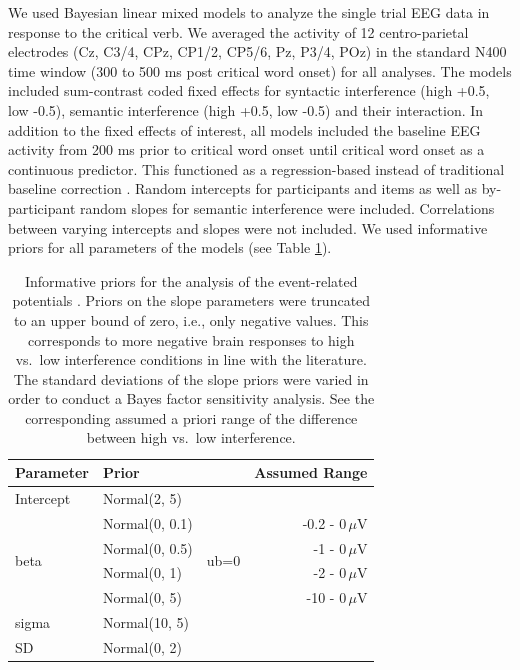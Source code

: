 \documentclass[a4paper, man, floatsintext]{apa7}
\begin{document}
We used Bayesian linear mixed models to analyze the single trial EEG data in response to the critical verb. We averaged the activity of 12 centro-parietal electrodes (Cz, C3/4, CPz, CP1/2, CP5/6, Pz, P3/4, POz) in the standard N400 time window (300 to 500 ms post critical word onset) for all analyses. The models included sum-contrast coded fixed effects for syntactic interference (high +0.5, low -0.5), semantic interference (high +0.5, low -0.5) and their interaction. In addition to the fixed effects of interest, all models included the baseline EEG activity from 200 ms prior to critical word onset until critical word onset as a continuous predictor. This functioned as a regression-based instead of traditional baseline correction \citep{alday2019}. Random intercepts for participants and items as well as by-participant random slopes for semantic interference were included. Correlations between varying intercepts and slopes were not included. We used informative priors for all parameters of the models (see Table \ref{tab:eeg_priors}). 

\begin{table}[]
    \caption{Informative priors for the analysis of the event-related potentials \citep{nicenboim_stats}. Priors on the slope parameters were truncated to an upper bound of zero, i.e., only negative values. This corresponds to more negative brain responses to high vs.\ low interference conditions in line with the literature. The standard deviations of the slope priors were varied in order to conduct a Bayes factor sensitivity analysis. See the corresponding assumed a priori range of the difference between high vs.\ low interference.}
    \label{tab:eeg_priors}
    \centering
    \begin{tabular}{lllr}
    \toprule
    Parameter&Prior & &Assumed Range\\
    \midrule
  Intercept & Normal(2, 5)& &\\
  \cmidrule{2-4}
  \multirow{4}{1cm}{beta} & Normal(0, 0.1) & \multirow{4}{1cm}{ub=0} & -0.2 - 0\,$\mu$V\\
  &  Normal(0, 0.5)& & -1 - 0\,$\mu$V\\
  & Normal(0, 1) && -2 - 0\,$\mu$V\\
  & Normal(0, 5) && -10 - 0\,$\mu$V\\
  \cmidrule{2-4}
  sigma & Normal(10, 5)&\\
  SD & Normal(0, 2)&\\
    \bottomrule
    \end{tabular}
\end{table}
\end{document}
